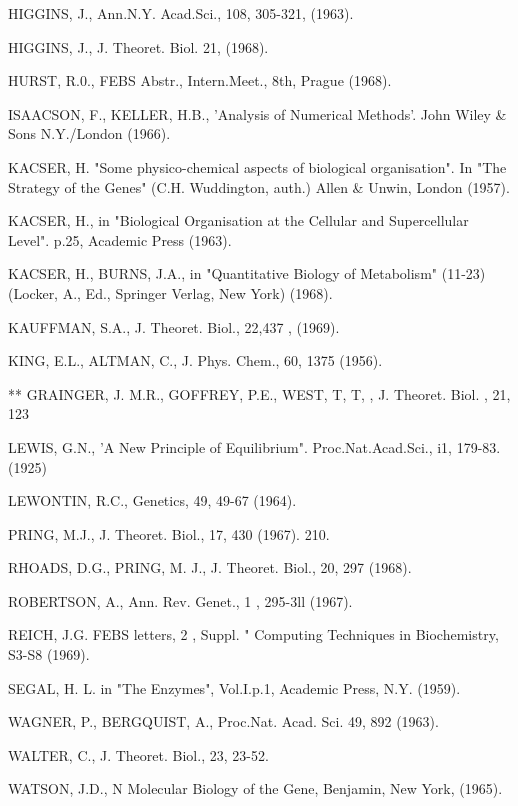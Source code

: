 \documentclass[11pt]{book}
\begin{document}
{HIGGINS, J., Ann.N.Y. Acad.Sci., 108, 305-321, (1963).

HIGGINS, J., J. Theoret. Biol. 21, (1968).

HURST, R.0., FEBS Abstr., Intern.Meet., 8th, Prague (1968).

ISAACSON, F., KELLER, H.B., 'Analysis of Numerical Methods'. John Wiley \& Sons N.Y./London (1966).

KACSER, H. "Some physico-chemical aspects of biological organisation". In "The Strategy of the Genes" (C.H. Wuddington, auth.) Allen \& Unwin, London (1957).

KACSER, H., in "Biological Organisation at the Cellular and Supercellular Level". p.25, Academic Press (1963).

KACSER, H., BURNS, J.A., in "Quantitative Biology of Metabolism" (11-23) (Locker, A., Ed., Springer Verlag, New York) (1968).

KAUFFMAN, S.A., J. Theoret. Biol., 22,437 , (1969).

KING, E.L., ALTMAN, C., J. Phys. Chem., 60, 1375 (1956).

** GRAINGER, J. M.R., GOFFREY, P.E., WEST, T, T, , J. Theoret. Biol. , 21, 123

LEWIS, G.N., 'A New Principle of Equilibrium". Proc.Nat.Acad.Sci., i1, 179-83. (1925)

LEWONTIN, R.C., Genetics, 49, 49-67 (1964).

PRING, M.J., J. Theoret. Biol., 17, 430 (1967). 210.

RHOADS, D.G., PRING, M. J., J. Theoret. Biol., 20, 297 (1968).

ROBERTSON, A., Ann. Rev. Genet., 1 , 295-3ll (1967).

REICH, J.G. FEBS letters, 2 , Suppl. " Computing Techniques in Biochemistry, S3-S8 (1969).

SEGAL, H. L. in "The Enzymes", Vol.I.p.1, Academic Press, N.Y. (1959).

WAGNER, P., BERGQUIST, A., Proc.Nat. Acad. Sci. 49, 892 (1963).

WALTER, C., J. Theoret. Biol., 23, 23-52.

WATSON, J.D., N Molecular Biology of the Gene, Benjamin, New York, (1965).
}
\end{document}
